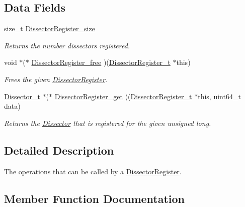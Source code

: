 \subsection*{Data Fields}
\begin{DoxyCompactItemize}
\item 
size\+\_\+t \hyperlink{struct_dissector_register__ops_abe25ddc2aed0125710137695861079e6}{Dissector\+Register\+\_\+size}
\begin{DoxyCompactList}\small\item\em Returns the number dissectors registered. \end{DoxyCompactList}\item 
\hypertarget{struct_dissector_register__ops_a35bbfa803ee2d70e035bd0526d4e6f81}{}void $\ast$($\ast$ \hyperlink{struct_dissector_register__ops_a35bbfa803ee2d70e035bd0526d4e6f81}{Dissector\+Register\+\_\+free} )(\hyperlink{struct_dissector_register}{Dissector\+Register\+\_\+t} $\ast$this)\label{struct_dissector_register__ops_a35bbfa803ee2d70e035bd0526d4e6f81}

\begin{DoxyCompactList}\small\item\em Frees the given \hyperlink{struct_dissector_register}{Dissector\+Register}. \end{DoxyCompactList}\item 
\hyperlink{struct_dissector}{Dissector\+\_\+t} $\ast$($\ast$ \hyperlink{struct_dissector_register__ops_a12af14c97dc640811729e46fc34aefdb}{Dissector\+Register\+\_\+get} )(\hyperlink{struct_dissector_register}{Dissector\+Register\+\_\+t} $\ast$this, uint64\+\_\+t data)
\begin{DoxyCompactList}\small\item\em Returns the \hyperlink{struct_dissector}{Dissector} that is registered for the given unsigned long. \end{DoxyCompactList}\end{DoxyCompactItemize}


\subsection{Detailed Description}
The operations that can be called by a \hyperlink{struct_dissector_register}{Dissector\+Register}. 

\subsection{Member Function Documentation}
\hypertarget{struct_dissector_register__ops_a8446d3a1c7fab1257da22cbede148d68}{}
